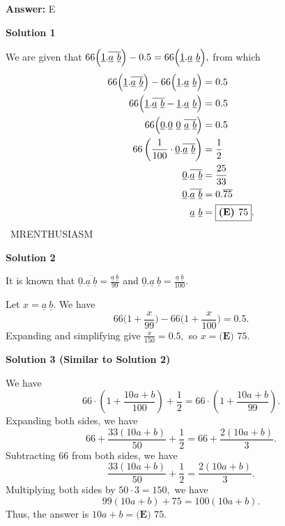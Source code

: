 \begin{enumerate}
 \textbf{Answer: }E



\textbf{Solution 1}

We are given that $66\Bigl(\underline{1}.\overline{\underline{a} \ \underline{b}}\Bigr)-0.5=66\Bigl(\underline{1}.\underline{a} \ \underline{b}\Bigr),$ from which
 \begin{align*} 66\Bigl(\underline{1}.\overline{\underline{a} \ \underline{b}}\Bigr)-66\Bigl(\underline{1}.\underline{a} \ \underline{b}\Bigr)&=0.5 \\ 66\Bigl(\underline{1}.\overline{\underline{a} \ \underline{b}} - \underline{1}.\underline{a} \ \underline{b}\Bigr)&=0.5 \\ 66\Bigl(\underline{0}.\underline{0} \ \underline{0} \ \overline{\underline{a} \ \underline{b}}\Bigr)&=0.5 \\ 66\left(\frac{1}{100}\cdot\underline{0}.\overline{\underline{a} \ \underline{b}}\right)&=\frac12 \\ \underline{0}.\overline{\underline{a} \ \underline{b}}&=\frac{25}{33} \\ \underline{0}.\overline{\underline{a} \ \underline{b}}&=0.\overline{75} \\ \underline{a} \ \underline{b}&=\boxed{\textbf{(E) }75}. \end{align*}
~MRENTHUSIASM

 



\textbf{Solution 2}

It is known that $\underline{0}.\overline{\underline{a} \ \underline{b}}=\frac{\underline{a} \ \underline{b}}{99}$ and $\underline{0}.\underline{a} \ \underline{b}=\frac{\underline{a} \ \underline{b}}{100}.$ 

 Let $x=\underline{a} \ \underline{b}.$ We have 
 \[66\biggl(1+\frac{x}{99}\biggr)-66\biggl(1+\frac{x}{100}\biggr)=0.5.\] Expanding and simplifying give $\frac{x}{150}=0.5,$ so $x=\boxed{\textbf{(E) }75}.$




\textbf{Solution 3 (Similar to Solution 2)}

We have 
 \[66 \cdot \left(1 + \frac{10a+b}{100}\right) + \frac{1}{2} = 66 \cdot \left(1+ \frac{10a+b}{99}\right).\]Expanding both sides, we have 
 \[66 + \frac{33(10a+b)}{50} + \frac{1}{2} = 66 + \frac{2(10a+b)}{3}.\]Subtracting $66$ from both sides, we have 
 \[\frac{33(10a+b)}{50} + \frac{1}{2} = \frac{2(10a+b)}{3}.\]Multiplying both sides by $50 \cdot 3 = 150,$ we have 
 \[99(10a+b) + 75 = 100(10a+b).\]Thus, the answer is $10a+b = \boxed{\textbf{(E) }75}.$


\end{enumerate}
